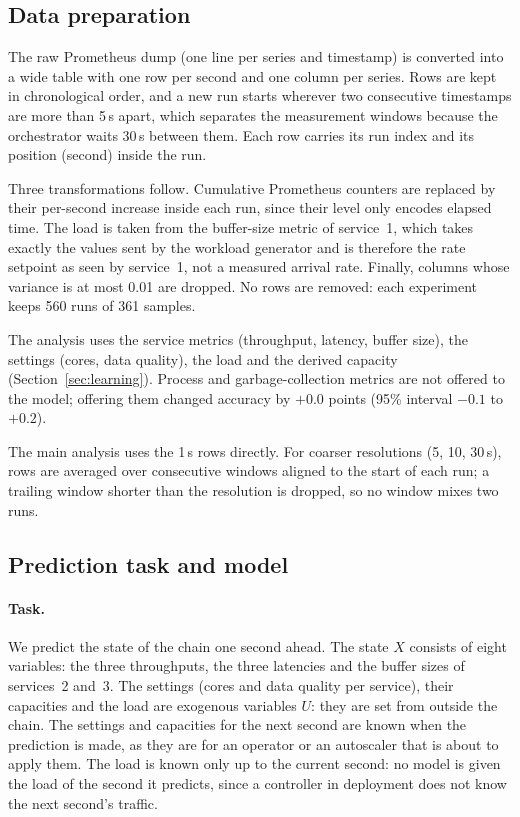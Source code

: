 \subsection{Data preparation}

The raw Prometheus dump (one line per series and timestamp) is converted into a wide table with one row per second and one column per series.
Rows are kept in chronological order, and a new run starts wherever two consecutive timestamps are more than 5\,s apart, which separates the measurement windows because the orchestrator waits 30\,s between them.
Each row carries its run index and its position (second) inside the run.

Three transformations follow.
Cumulative Prometheus counters are replaced by their per-second increase inside each run, since their level only encodes elapsed time.
The load is taken from the buffer-size metric of service~1, which takes exactly the values sent by the workload generator and is therefore the rate setpoint as seen by service~1, not a measured arrival rate.
Finally, columns whose variance is at most 0.01 are dropped.
No rows are removed: each experiment keeps 560 runs of 361 samples.

The analysis uses the service metrics (throughput, latency, buffer size), the settings (cores, data quality), the load and the derived capacity (Section~\ref{sec:learning}).
Process and garbage-collection metrics are not offered to the model; offering them changed accuracy by $+0.0$ points (95\% interval $-0.1$ to $+0.2$).

The main analysis uses the 1\,s rows directly.
For coarser resolutions (5, 10, 30\,s), rows are averaged over consecutive windows aligned to the start of each run; a trailing window shorter than the resolution is dropped, so no window mixes two runs.

\subsection{Prediction task and model}
\label{sec:model}

\paragraph{Task.}
We predict the state of the chain one second ahead.
The state $X$ consists of eight variables: the three throughputs, the three latencies and the buffer sizes of services~2 and~3.
The settings (cores and data quality per service), their capacities and the load are exogenous variables $U$: they are set from outside the chain.
The settings and capacities for the next second are known when the prediction is made, as they are for an operator or an autoscaler that is about to apply them.
The load is known only up to the current second: no model is given the load of the second it predicts, since a controller in deployment does not know the next second's traffic.

